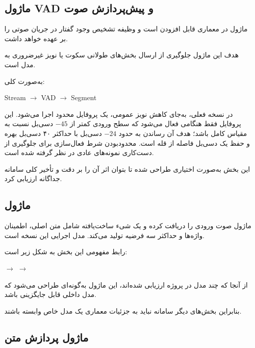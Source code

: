 \subsection{ماژول VAD و پیش‌پردازش صوت}

ماژول
در معماری قابل افزودن است و وظیفه تشخیص وجود گفتار در جریان
صوتی را بر عهده خواهد داشت.

هدف این ماژول جلوگیری از ارسال بخش‌های طولانی سکوت یا
نویز غیرضروری به مدل  است.

به‌صورت کلی:

\begin{center}
 Stream
$\longrightarrow$
VAD
$\longrightarrow$
 Segment
\end{center}

در نسخه فعلی، به‌جای کاهش نویز عمومی، یک پروفایل محدود
 اجرا می‌شود. این پروفایل فقط هنگامی فعال
می‌شود که سطح ورودی کمتر از $-45$ دسی‌بل نسبت به مقیاس کامل باشد؛
هدف آن رساندن  به حدود $-24$ دسی‌بل با حداکثر ۴۰ دسی‌بل
بهره و حفظ یک دسی‌بل فاصله از قله است. محدودبودن شرط فعال‌سازی
برای جلوگیری از دست‌کاری نمونه‌های عادی در نظر گرفته شده است.

این بخش به‌صورت اختیاری طراحی شده تا بتوان اثر آن را بر
دقت  و تأخیر کلی سامانه جداگانه ارزیابی کرد.


\subsection{ماژول }

ماژول  صوت ورودی را دریافت کرده و یک شیء ساخت‌یافته شامل
متن اصلی، اطمینان واژه‌ها و حداکثر سه فرضیه تولید می‌کند. مدل
اجرایی این نسخه  است.

رابط مفهومی این بخش به شکل زیر است:

\begin{center}
$\longrightarrow$
 
$\longrightarrow$
\end{center}

از آنجا که چند مدل  در پروژه ارزیابی شده‌اند، این ماژول
به‌گونه‌ای طراحی می‌شود که مدل داخلی قابل جایگزینی باشد.

بنابراین بخش‌های دیگر سامانه نباید به جزئیات معماری یک مدل
خاص وابسته باشند.


\subsection{ماژول پردازش متن}

